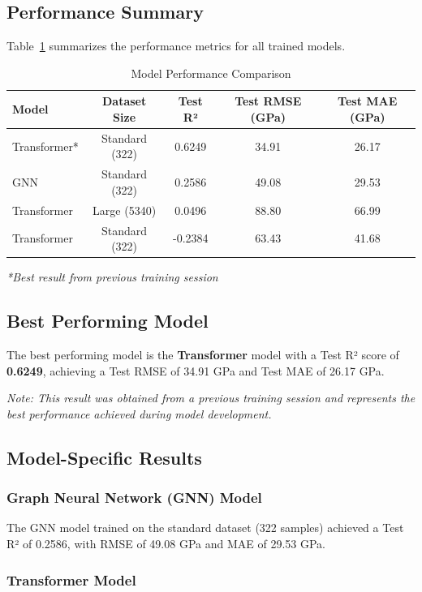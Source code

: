 \documentclass[11pt,a4paper]{article}
\begin{document}
\subsection{Performance Summary}

Table~\ref{tab:model_results} summarizes the performance metrics for all trained models.

\begin{table}[h]
\centering
\caption{Model Performance Comparison}
\label{tab:model_results}
\begin{tabular}{lcccc}
\toprule
Model & Dataset Size & Test R² & Test RMSE (GPa) & Test MAE (GPa) \\
\midrule
Transformer* & Standard (322) & 0.6249 & 34.91 & 26.17 \\
GNN & Standard (322) & 0.2586 & 49.08 & 29.53 \\
Transformer & Large (5340) & 0.0496 & 88.80 & 66.99 \\
Transformer & Standard (322) & -0.2384 & 63.43 & 41.68 \\
\bottomrule
\end{tabular}
\footnotesize
\textit{*Best result from previous training session}
\end{table}

\subsection{Best Performing Model}

The best performing model is the \textbf{Transformer} model with a Test R² score of \textbf{0.6249}, achieving a Test RMSE of 34.91 GPa and Test MAE of 26.17 GPa.

\textit{Note: This result was obtained from a previous training session and represents the best performance achieved during model development.}

\subsection{Model-Specific Results}

\subsubsection{Graph Neural Network (GNN) Model}

The GNN model trained on the standard dataset (322 samples) achieved a Test R² of 0.2586, with RMSE of 49.08 GPa and MAE of 29.53 GPa.

\subsubsection{Transformer Model}
\end{document}
